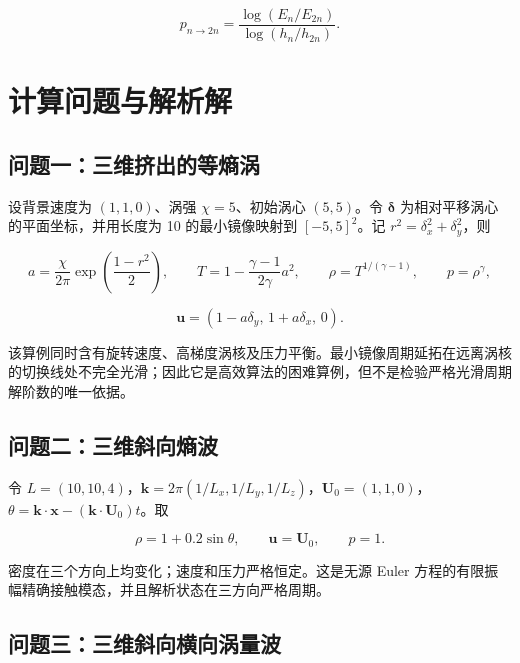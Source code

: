 \documentclass[
  a4paper,
]{ctexart}
\begin{document}
\[
p_{n\to 2n}=\frac{\log(E_n/E_{2n})}{\log(h_n/h_{2n})}.
\]

\hypertarget{ux8ba1ux7b97ux95eeux9898ux4e0eux89e3ux6790ux89e3}{%
\section{计算问题与解析解}\label{ux8ba1ux7b97ux95eeux9898ux4e0eux89e3ux6790ux89e3}}

\hypertarget{ux95eeux9898ux4e00ux4e09ux7ef4ux6324ux51faux7684ux7b49ux71b5ux6da1}{%
\subsection{问题一：三维挤出的等熵涡}\label{ux95eeux9898ux4e00ux4e09ux7ef4ux6324ux51faux7684ux7b49ux71b5ux6da1}}

设背景速度为 \((1,1,0)\)、涡强 \(\chi=5\)、初始涡心 \((5,5)\)。令
\(\boldsymbol{\delta}\) 为相对平移涡心的平面坐标，并用长度为 10
的最小镜像映射到 \([-5,5]^2\)。记 \(r^2=\delta_x^2+\delta_y^2\)，则

\[
a=\frac{\chi}{2\pi}\exp\left(\frac{1-r^2}{2}\right),\qquad
T=1-\frac{\gamma-1}{2\gamma}a^2,\qquad
\rho=T^{1/(\gamma-1)},\qquad p=\rho^\gamma,
\]

\[
\boldsymbol{u}=(1-a\delta_y,\,1+a\delta_x,\,0).
\]

该算例同时含有旋转速度、高梯度涡核及压力平衡。最小镜像周期延拓在远离涡核的切换线处不完全光滑；因此它是高效算法的困难算例，但不是检验严格光滑周期解阶数的唯一依据。

\hypertarget{ux95eeux9898ux4e8cux4e09ux7ef4ux659cux5411ux71b5ux6ce2}{%
\subsection{问题二：三维斜向熵波}\label{ux95eeux9898ux4e8cux4e09ux7ef4ux659cux5411ux71b5ux6ce2}}

令
\(L=(10,10,4)\)，\(\boldsymbol{k}=2\pi(1/L_x,1/L_y,1/L_z)\)，\(\boldsymbol{U}_0=(1,1,0)\)，\(\theta=\boldsymbol{k}\cdot\boldsymbol{x}-(\boldsymbol{k}\cdot\boldsymbol{U}_0)t\)。取

\[
\rho=1+0.2\sin\theta,\qquad \boldsymbol{u}=\boldsymbol{U}_0,\qquad p=1.
\]

密度在三个方向上均变化；速度和压力严格恒定。这是无源 Euler
方程的有限振幅精确接触模态，并且解析状态在三方向严格周期。

\hypertarget{ux95eeux9898ux4e09ux4e09ux7ef4ux659cux5411ux6a2aux5411ux6da1ux91cfux6ce2}{%
\subsection{问题三：三维斜向横向涡量波}\label{ux95eeux9898ux4e09ux4e09ux7ef4ux659cux5411ux6a2aux5411ux6da1ux91cfux6ce2}}
\end{document}
